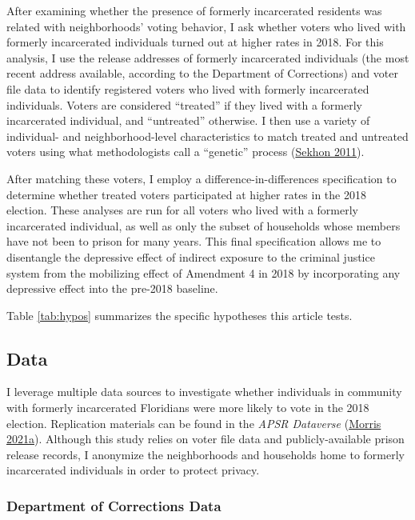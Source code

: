 \documentclass[
  12pt,
]{article}
\begin{document}
After examining whether the presence of formerly incarcerated residents was related with neighborhoods' voting behavior, I ask whether voters who lived with formerly incarcerated individuals turned out at higher rates in 2018. For this analysis, I use the release addresses of formerly incarcerated individuals (the most recent address available, according to the Department of Corrections) and voter file data to identify registered voters who lived with formerly incarcerated individuals. Voters are considered ``treated'' if they lived with a formerly incarcerated individual, and ``untreated'' otherwise. I then use a variety of individual- and neighborhood-level characteristics to match treated and untreated voters using what methodologists call a ``genetic'' process (\protect\hyperlink{ref-Sekhon2011}{Sekhon 2011}).

After matching these voters, I employ a difference-in-differences specification to determine whether treated voters participated at higher rates in the 2018 election. These analyses are run for all voters who lived with a formerly incarcerated individual, as well as only the subset of households whose members have not been to prison for many years. This final specification allows me to disentangle the depressive effect of indirect exposure to the criminal justice system from the mobilizing effect of Amendment 4 in 2018 by incorporating any depressive effect into the pre-2018 baseline.

Table \ref{tab:hypos} summarizes the specific hypotheses this article tests.



\hypertarget{data}{%
\subsection*{Data}\label{data}}

I leverage multiple data sources to investigate whether individuals in community with formerly incarcerated Floridians were more likely to vote in the 2018 election. Replication materials can be found in the \emph{APSR Dataverse} (\protect\hyperlink{ref-Morris2021a}{Morris 2021a}). Although this study relies on voter file data and publicly-available prison release records, I anonymize the neighborhoods and households home to formerly incarcerated individuals in order to protect privacy.

\hypertarget{department-of-corrections-data}{%
\subsubsection*{Department of Corrections Data}\label{department-of-corrections-data}}
\end{document}
